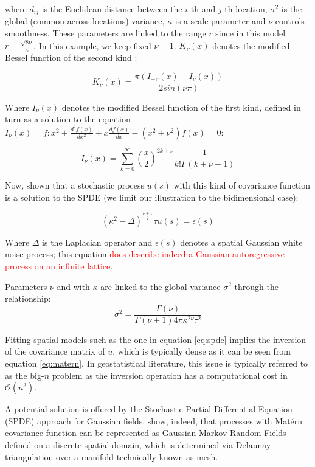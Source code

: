 \documentclass[openany]{book}
\begin{document}
where $d_{ij}$ is the Euclidean distance between the $i$-th and $j$-th location, $\sigma^2$ is the global (common across locations) variance, %
$\kappa$ is a scale parameter and $\nu$ controls smoothness. These parameters are linked to the range $r$ since in this model $r = \frac{\sqrt{8\nu}}{\kappa}$. In this example, we keep fixed $\nu = 1$.  $K_{\nu}(x)$ denotes the modified Bessel function of the second kind \citep[][Section 9.6]{AS}:

$$
K_{\nu}(x) = \frac{\pi \left( I_{-\nu}(x) - I_{\nu}(x)\right)}{2 sin (\nu \pi)}
$$

Where $I_{\nu}(x)$ denotes the modified Bessel function of the first kind, defined in turn as a solution to the equation $I_\nu(x) = f:x^2 + \frac{d^2f(x)}{dx^2}+x\frac{df(x)}{dx} - (x^2+\nu^2)f(x) = 0$:

$$
I_{\nu}(x) = \sum_{k=0}^\infty \left( \frac{x}{2} \right)^{2k+\nu}\frac{1}{k! \Gamma(k+\nu+1)}
$$

Now, \cite{Whittle} shown that a stochastic process $u(s)$ with this kind of covariance function is a solution to the SPDE (we limit our illustration to the bidimensional case):

\begin{equation}
(\kappa^2 - \Delta)^{\frac{\nu + 1}{2}} \tau u(s) = \epsilon(s)
\label{spde}
\end{equation}

Where $\Delta$ is the Laplacian operator and $\epsilon(s)$ denotes a spatial Gaussian white noise process; this equation \textcolor{red}{does describe indeed a Gaussian autoregressive process on an infinite lattice}.

Parameters $\nu$ and with $\kappa$ are linked to the global variance $\sigma^2$ through the relationship:
$$
\sigma^2 = \frac{\Gamma(\nu)}{\Gamma(\nu +1) 4 \pi \kappa^{2 \nu} \tau^2}
$$


Fitting spatial models such as the one in equation \ref{eq:spde} implies the inversion of the covariance matrix of $u$, which is typically dense as it can be seen from equation \ref{eq:matern}. In geostatistical literature, this issue is typically referred to as the big-$n$ problem \citep{bigN} as the inversion operation has a computational cost in $\mathcal{O}(n^3)$. 

A potential solution is offered by the Stochastic Partial Differential Equation (SPDE) approach for Gaussian fields. \cite{SPDE} show, indeed, that processes with Matérn covariance function can be represented as Gaussian Markov Random Fields defined on a discrete spatial domain, which is determined via Delaunay triangulation over a manifold technically known as mesh. 
\end{document}
